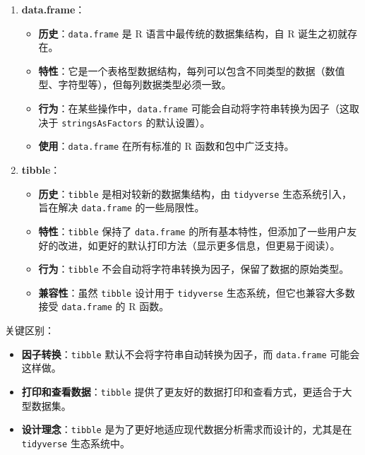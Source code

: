 \documentclass[
]{article}
\begin{document}
\begin{enumerate}
\def\labelenumi{\arabic{enumi}.}
\item
  \textbf{data.frame}：

  \begin{itemize}
  \item
    \textbf{历史}：\texttt{data.frame} 是 R 语言中最传统的数据集结构，自
    R 诞生之初就存在。
  \item
    \textbf{特性}：它是一个表格型数据结构，每列可以包含不同类型的数据（数值型、字符型等），但每列数据类型必须一致。
  \item
    \textbf{行为}：在某些操作中，\texttt{data.frame}
    可能会自动将字符串转换为因子（这取决于 \texttt{stringsAsFactors}
    的默认设置）。
  \item
    \textbf{使用}：\texttt{data.frame} 在所有标准的 R
    函数和包中广泛支持。
  \end{itemize}
\item
  \textbf{tibble}：

  \begin{itemize}
  \item
    \textbf{历史}：\texttt{tibble} 是相对较新的数据集结构，由
    \texttt{tidyverse} 生态系统引入，旨在解决 \texttt{data.frame}
    的一些局限性。
  \item
    \textbf{特性}：\texttt{tibble} 保持了 \texttt{data.frame}
    的所有基本特性，但添加了一些用户友好的改进，如更好的默认打印方法（显示更多信息，但更易于阅读）。
  \item
    \textbf{行为}：\texttt{tibble}
    不会自动将字符串转换为因子，保留了数据的原始类型。
  \item
    \textbf{兼容性}：虽然 \texttt{tibble} 设计用于 \texttt{tidyverse}
    生态系统，但它也兼容大多数接受 \texttt{data.frame} 的 R 函数。
  \end{itemize}
\end{enumerate}

关键区别：

\begin{itemize}
\item
  \textbf{因子转换}：\texttt{tibble} 默认不会将字符串自动转换为因子，而
  \texttt{data.frame} 可能会这样做。
\item
  \textbf{打印和查看数据}：\texttt{tibble}
  提供了更友好的数据打印和查看方式，更适合于大型数据集。
\item
  \textbf{设计理念}：\texttt{tibble}
  是为了更好地适应现代数据分析需求而设计的，尤其是在 \texttt{tidyverse}
  生态系统中。
\end{itemize}
\end{document}
